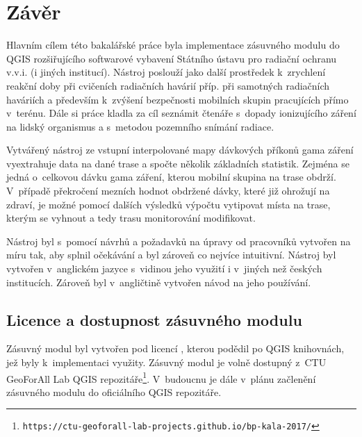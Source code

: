 \chapter{Závěr}
\label{5-zaver}

Hlavním cílem této bakalářské práce byla implementace zásuvného modulu do QGIS rozšiřujícího softwarové vybavení Státního ústavu pro radiační ochranu v.v.i. (i jiných institucí). Nástroj poslouží jako další prostředek k~zrychlení reakční doby při cvičeních radiačních havárií příp. při samotných radiačních haváriích a především k~zvýšení bezpečnosti mobilních skupin pracujících přímo v~terénu. Dále si práce kladla za cíl seznámit čtenáře s~dopady ionizujícího záření na lidský organismus a s~metodou pozemního snímání radiace. 

Vytvářený nástroj ze vstupní interpolované mapy dávkových příkonů gama záření vyextrahuje data na dané trase a spočte několik základních statistik. Zejména se jedná o~celkovou dávku gama záření, kterou mobilní skupina na trase obdrží. V~případě překročení mezních hodnot obdržené dávky, které již ohrožují na zdraví, je možné pomocí dalších výsledků výpočtu vytipovat místa na trase, kterým se vyhnout a tedy trasu monitorování modifikovat. 

Nástroj byl s~pomocí návrhů a požadavků na úpravy od pracovníků  vytvořen na míru tak, aby splnil očekávání a byl zároveň co nejvíce intuitivní. Nástroj byl vytvořen v~anglickém jazyce s~vidinou jeho využití i v~jiných než českých institucích. Zároveň byl v~angličtině vytvořen návod na jeho používání. 


\section{Licence a dostupnost zásuvného modulu}
Zásuvný modul byl vytvořen pod licencí , kterou podědil po QGIS knihovnách, jež byly k~implementaci využity. Zásuvný modul je volně dostupný z~CTU GeoForAll Lab QGIS repozitáře\footnote{\texttt{https://ctu-geoforall-lab-projects.github.io/bp-kala-2017/}}. V~budoucnu je dále v~plánu začlenění zásuvného modulu do oficiálního QGIS repozitáře.


 



